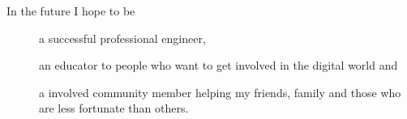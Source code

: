 
\begin{cvparagraph}

In the future I hope to be
\begin{description}
  \item[] a successful professional engineer,
  \item[] an educator to people who want to get involved in the digital world and
  \item[] a involved community member helping my friends, family and those who are less fortunate than others.
\end{description}
\end{cvparagraph}
